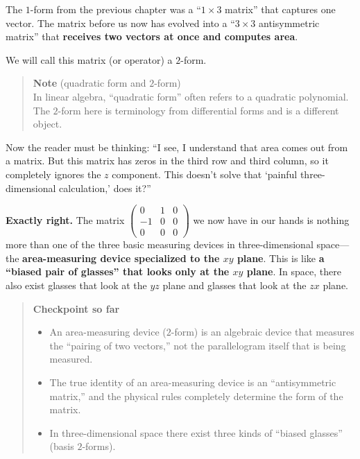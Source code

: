 \documentclass[a4paper,12pt,openany]{book}
\begin{document}
The \(1\)-form from the previous chapter was a ``\(1 \times 3\) matrix''
that captures one vector. The matrix before us now has evolved into a
``\(3 \times 3\) antisymmetric matrix'' that \textbf{receives two
vectors at once and computes area}.

We will call this matrix (or operator) a \(2\)-form.

\begin{quote}
\textbf{Note} (quadratic form and \(2\)-form)\\
In linear algebra, ``quadratic form'' often refers to a quadratic
polynomial. The \(2\)-form here is terminology from differential forms
and is a different object.
\end{quote}

Now the reader must be thinking: ``I see, I understand that area comes
out from a matrix. But this matrix has zeros in the third row and third
column, so it completely ignores the \(z\) component. This doesn't solve
that `painful three-dimensional calculation,' does it?''

\textbf{Exactly right.} The matrix
\(\begin{pmatrix} 0 & 1 & 0 \\ -1 & 0 & 0 \\ 0 & 0 & 0 \end{pmatrix}\)
we now have in our hands is nothing more than one of the three basic
measuring devices in three-dimensional space—the
\textbf{area-measuring device specialized to the $xy$ plane}. This is
like
\textbf{a “biased pair of glasses” that looks only at the $xy$ plane}.
In space, there also exist glasses that look at the \(yz\) plane and
glasses that look at the \(zx\) plane.

\par\vspace{0.35em}\par

\begin{quote}
\textbf{Checkpoint so far}

\begin{itemize}
\item
  An area-measuring device (\(2\)-form) is an algebraic device that
  measures the ``pairing of two vectors,'' not the parallelogram itself
  that is being measured.
\item
  The true identity of an area-measuring device is an ``antisymmetric
  matrix,'' and the physical rules completely determine the form of the
  matrix.
\item
  In three-dimensional space there exist three kinds of ``biased
  glasses'' (basis \(2\)-forms).
\end{itemize}
\end{quote}
\end{document}
